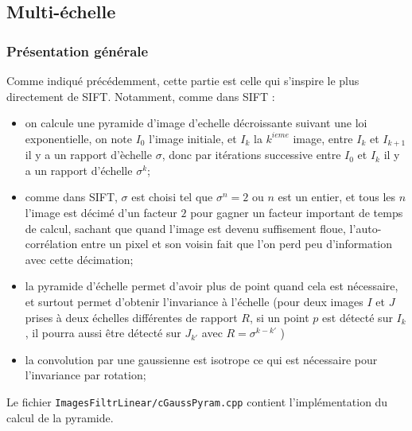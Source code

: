 
\subsection{Multi-\'echelle}

\subsubsection{Pr\'esentation g\'en\'erale}

Comme indiqu\'e pr\'ec\'edemment, cette partie est celle qui s'inspire le plus directement de SIFT.
Notamment, comme dans SIFT :

\begin{itemize}
    \item on calcule une pyramide d'image d'echelle d\'ecroissante suivant une loi exponentielle, 
          on note $I_0$ l'image initiale, et $I_k$ la $k^{ieme}$ image, entre $I_k$ et $I_{k+1}$
          il y a un rapport d'\`echelle $\sigma$, donc par it\'erations successive entre $I_0$
          et $I_k$ il y a un rapport d'\'echelle $\sigma^k$;

    \item comme dans SIFT, $\sigma$ est choisi tel que $\sigma^n=2$ ou $n$ est un entier, et
          tous les $n$ l'image est d\'ecim\'e d'un facteur $2$ pour gagner un facteur important de temps
          de calcul, sachant que quand l'image est devenu suffisement floue, l'auto-corr\'elation entre un
          pixel et son voisin fait que l'on perd peu d'information avec cette d\'ecimation;

    \item  la pyramide d'\'echelle permet d'avoir plus de point quand cela est n\'ecessaire, et surtout
           permet d'obtenir l'invariance \`a l'\'echelle (pour deux images $I$ et $J$ prises \`a deux
           \'echelles diff\'erentes de rapport $R$, si un point $p$ est d\'etect\'e sur $I_k$, il pourra aussi
           \^etre d\'etect\'e sur $J_{k'}$ avec $R = \sigma^{k-k'}$ )

    \item  la convolution par une gaussienne est isotrope ce qui  est n\'ecessaire pour l'invariance par rotation;


\end{itemize}

Le fichier {\tt ImagesFiltrLinear/cGaussPyram.cpp} contient l'impl\'ementation du calcul de la pyramide.


